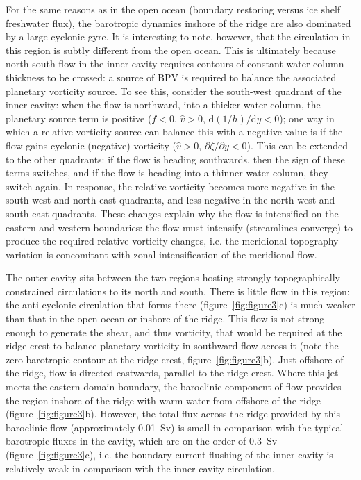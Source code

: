 \documentclass[draft]{agujournal2019}
\begin{document}
For the same reasons as in the open ocean (boundary restoring versus ice shelf freshwater flux), the barotropic dynamics inshore of the ridge are also dominated by a large cyclonic gyre. It is interesting to note, however, that the circulation in this region is subtly different from the open ocean. This is ultimately because north-south flow in the inner cavity requires contours of constant water column thickness to be crossed: a source of BPV is required to balance the associated planetary vorticity source. To see this, consider the south-west quadrant of the inner cavity: when the flow is northward, into a thicker water column, the planetary source term is positive ($f<0$, $\hat{v}>0$, $\mathrm{d}(1/h)/\mathrm{d}y<0$); one way in which a relative vorticity source can balance this with a negative value is if the flow gains cyclonic (negative) vorticity ($\hat{v}>0$, $\partial \zeta/\partial y<0$). This can be extended to the other quadrants: if the flow is heading southwards, then the sign of these terms switches, and if the flow is heading into a thinner water column, they switch again. In response, the relative vorticity becomes more negative in the south-west and north-east quadrants, and less negative in the north-west and south-east quadrants. These changes explain why the flow is intensified on the eastern and western boundaries: the flow must intensify (streamlines converge) to produce the required relative vorticity changes, i.e. the meridional topography variation is concomitant with zonal intensification of the meridional flow.

The outer cavity sits between the two regions hosting strongly topographically constrained circulations to its north and south. There is little flow in this region: the anti-cyclonic circulation that forms there (figure~\ref{fig:figure3}c) is much weaker than that in the open ocean or inshore of the ridge. This flow is not strong enough to generate the shear, and thus vorticity, that would be required at the ridge crest to balance planetary vorticity in southward flow across it (note the zero barotropic contour at the ridge crest, figure~\ref{fig:figure3}b). Just offshore of the ridge, flow is directed eastwards, parallel to the ridge crest. Where this jet meets the eastern domain boundary, the baroclinic component of flow provides the region inshore of the ridge with warm water from offshore of the ridge (figure~\ref{fig:figure3}b). However, the total flux across the ridge provided by this baroclinic flow (approximately 0.01~Sv) is small in comparison with the typical barotropic fluxes in the cavity, which are on the order of 0.3~Sv  (figure~\ref{fig:figure3}c), i.e. the boundary current flushing of the inner cavity is relatively weak in comparison with the inner cavity circulation.
\end{document}
